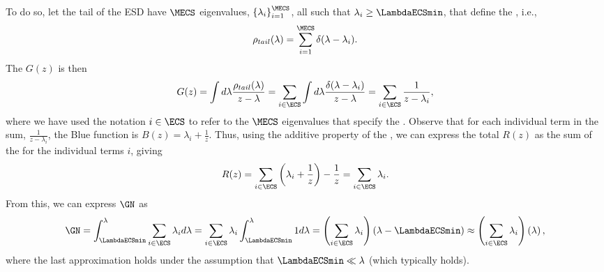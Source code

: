 To do so, let the tail of the ESD have 
$\MECS$ 
eigenvalues, $ \left\{ \lambda_i \right\}_{i=1}^{\MECS}$, all such that $\lambda_{i}\ge \LambdaECSmin$, that define the \ECS, i.e.,  
\begin{equation}
\label{eqn:spikes_model_0}
\rho_{tail}(\lambda)=\sum_{i=1}^{\MECS}\delta(\lambda-\lambda_{i}) .
\end{equation}
The \GreensFunction $G(z)$ is then
\begin{equation}
\label{eqn:spikes_model_1}
G(z) = \int d\lambda \dfrac{ \rho_{tail}(\lambda) }{z - \lambda} 
     = \sum_{i \in \ECS} \int d\lambda \dfrac{\delta(\lambda-\lambda_{i})}{z - \lambda} 
     = \sum_{i \in \ECS} \dfrac{1}{z-\lambda_{i}}  ,
\end{equation}
where we have used the notation $i \in \ECS$ to refer to the $\MECS$ eigenvalues that specify the \ECS.
Observe that for each individual term in the sum, $\frac{1}{z-\lambda_{i}}$, the Blue function is $B(z) = \lambda_{i}+\frac{1}{z}$.
Thus, using the additive property of the \RTransform, we can express the total $R(z)$ as the sum of the \RTransforms for the individual terms $i$, giving
\begin{equation}
\label{eqn:spikes_model_2}
R(z) =\sum_{i\in\ECS}\left(\lambda_{i}+ \dfrac{1}{z}\right) - \dfrac{1}{z}=
\sum_{i\in\ECS}\lambda_{i}  .
\end{equation}
From this, we can express $\GN$ as
\begin{align}
\label{eqn:spikes_model_3} 
\GN 
= \int_{\LambdaECSmin}^{\lambda}\sum_{i\in\ECS}\lambda_{i} d\lambda 
= \sum_{i\in\ECS}\lambda_{i} \int_{\LambdaECSmin}^{\lambda} 1 d\lambda 
= \left(\sum_{i\in\ECS}\lambda_{i}\right)\left(\lambda-\LambdaECSmin\right)
\approx \left(\sum_{i\in\ECS}\lambda_{i}\right)\left(\lambda\right) ,
\end{align}
where the last approximation holds under the assumption that $\LambdaECSmin \ll \lambda$ (which typically holds).

